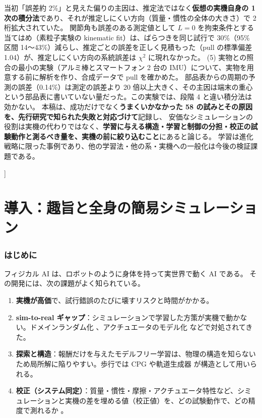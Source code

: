 \documentclass[paper=a4paper,fontsize=10pt,twocolumn,column_gap=2zw,line_length=24zw,number_of_lines=46,head_space=20mm]{jlreq}
\begin{document}
\begin{@twocolumnfalse}
\begin{center}
\begin{minipage}{0.9\textwidth}
当初「誤差約 2\%」と見えた偏りの主因は、推定法ではなく\textbf{仮想の実機自身の 1 次の積分法}であり、それが推定しにくい方向（質量・慣性の全体の大きさ）で 2 桁拡大されていた。
関節角も誤差のある測定値として $L=0$ を拘束条件とする当てはめ（素粒子実験の kinematic fit）は、ばらつきを同じ試行で 30\%（95\% 区間 14〜43\%）減らし、推定ごとの誤差を正しく見積もった（pull の標準偏差 1.04）が、推定しにくい方向の系統誤差は $\chi^2$ に現れなかった。
(5) 実物との照合の最小の実験（アルミ棒とスマートフォン 2 台の IMU）について、実物を用意する前に解析を作り、合成データで pull を確かめた。
部品表からの周期の予測の誤差（0.14\%）は測定の誤差より 20 倍以上大きく、その主因は端末の重心という部品表に書いていない量だった。この実験では、段階 4 と違い積分法は効かない。
本稿は、成功だけでなく\textbf{うまくいかなかった 58 の試みとその原因を、先行研究で知られた失敗と対応づけて}記録し、
安価なシミュレーションの役割は実機の代わりではなく、\textbf{学習に与える構造・学習と制御の分担・校正の試験動作と測るべき量を、実機の前に絞り込むこと}にあると論じる。
学習は進化戦略に限った事例であり、他の学習法・他の系・実機への一般化は今後の検証課題である。
\end{minipage}\end{center}
\vspace{1em}
\end{@twocolumnfalse}
]

\part{導入：趣旨と全身の簡易シミュレーション}

\section{はじめに}\label{sec:intro}

フィジカル AI は、ロボットのように身体を持って実世界で動く AI である。
その開発には、次の課題がよく知られている。
\begin{enumerate}\setlength{\itemsep}{0pt}
\item \textbf{実機が高価}で、試行錯誤のたびに壊すリスクと時間がかかる。
\item \textbf{sim-to-real ギャップ}：シミュレーションで学習した方策が実機で動かない。ドメインランダム化 \cite{tobin2017,peng2018}、アクチュエータのモデル化 \cite{hwangbo2019} などで対処されてきた。
\item \textbf{探索と構造}：報酬だけを与えたモデルフリー学習は、物理の構造を知らないため局所解に陥りやすい。歩行では CPG \cite{ijspeert2008} や軌道生成器 \cite{iscen2018} が構造として用いられる。
\item \textbf{校正（システム同定）}：質量・慣性・摩擦・アクチュエータ特性など、シミュレーションと実機の差を埋める値（校正値）を、どの試験動作で、どの精度で測れるか \cite{atkeson1986,gautier1990}。
\end{enumerate}
\end{document}
